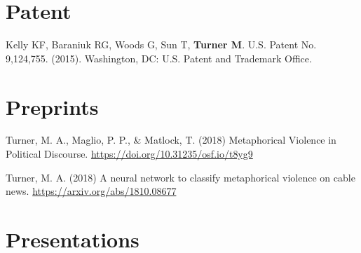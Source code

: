 \documentclass[letterpaper,11pt,oneside]{article}
\begin{document}
\noindent
\section*{\textcolor{gunmetal}{Patent}}

  \begin{hangparas}{0.25in}{1}
  Kelly KF, Baraniuk RG, Woods G, Sun T, \textbf{Turner M}. U.S. Patent No. 9,124,755. (2015).
Washington, DC: U.S. Patent and Trademark Office.    
    
  \end{hangparas}

\noindent
\section*{\textcolor{gunmetal}{Preprints}}
\begin{hangparas}{0.25in}{1}

  Turner, M. A., Maglio, P. P., \& Matlock, T. (2018) Metaphorical Violence in Political Discourse. \url{https://doi.org/10.31235/osf.io/t8yg9}

  Turner, M. A. (2018) A neural network to classify metaphorical violence on cable news. \url{https://arxiv.org/abs/1810.08677}

\end{hangparas}

\noindent

\section*{\textcolor{gunmetal}{Presentations}}
\end{document}
